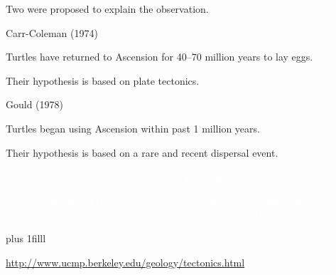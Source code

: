 \documentclass[t,handout]{beamer}  %
\newcommand{\btVFill}{\vskip0pt plus 1filll}
\begin{document}
\begin{frame}[t]{Two  were proposed to explain the observation.}
	\setlength{\columnseprule}{0.4pt}

	\begin{multicols}{2}
	
		\hangpara Carr-Coleman (1974)
		
		\hangpara Turtles have returned to Ascension for 40–70 million years to lay eggs.
		
		\hangpara Their hypothesis is based on plate tectonics. 
		
	\columnbreak
	
		\hangpara Gould (1978)
		
		\hangpara Turtles began using Ascension within past 1 million years.
		
		\hangpara Their hypothesis is based on a rare and recent dispersal event.
	\end{multicols}
\end{frame}


{
\begin{frame}[t]{\textcolor{white}{Plate tectonics causes continents to shift positions over time.}}
	\begin{center}
	\end{center}

	\textcolor{white}{As Ascension Island (red dot) separated from Brazil over millions of years, generations of turtles continued to visit the island to breed.}

	\btVFill

	\hfill\tiny \textcolor{white}{\url{http://www.ucmp.berkeley.edu/geology/tectonics.html}}

\end{frame}
}
\end{document}
